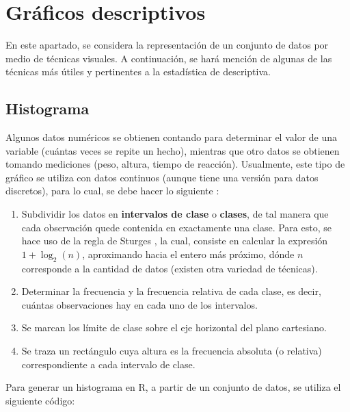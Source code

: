 \documentclass[
]{book}
\providecommand{\tightlist}{%
  \setlength{\itemsep}{0pt}\setlength{\parskip}{0pt}}
\begin{document}
\hypertarget{gruxe1ficos-descriptivos}{%
\section{Gráficos descriptivos}\label{gruxe1ficos-descriptivos}}

En este apartado, se considera la representación de un conjunto de datos por medio de técnicas visuales. A continuación, se hará mención de algunas de las técnicas más útiles y pertinentes a la estadística de descriptiva.

\hypertarget{histograma}{%
\subsection{Histograma}\label{histograma}}

Algunos datos numéricos se obtienen contando para determinar el valor de una variable (cuántas veces se repite un hecho), mientras que otro datos se obtienen tomando mediciones (peso, altura, tiempo de reacción). Usualmente, este tipo de gráfico se utiliza con datos continuos (aunque tiene una versión para datos discretos), para lo cual, se debe hacer lo siguiente \citep[página 12]{Devore}:

\begin{enumerate}
\def\labelenumi{\arabic{enumi}.}
\tightlist
\item
  Subdividir los datos en \textbf{intervalos de clase} o \textbf{clases}, de tal manera que cada observación quede contenida en exactamente una clase. Para esto, se hace uso de la regla de Sturges \citeyearpar{sturges1926choice}, la cual, consiste en calcular la expresión \(1+\log_2(n)\), aproximando hacia el entero más próximo, dónde \(n\) corresponde a la cantidad de datos (existen otra variedad de técnicas).
\item
  Determinar la frecuencia y la frecuencia relativa de cada clase, es decir, cuántas observaciones hay en cada uno de los intervalos.
\item
  Se marcan los límite de clase sobre el eje horizontal del plano cartesiano.
\item
  Se traza un rectángulo cuya altura es la frecuencia absoluta (o relativa) correspondiente a cada intervalo de clase.
\end{enumerate}

Para generar un histograma en R, a partir de un conjunto de datos, se utiliza el siguiente código:
\end{document}
